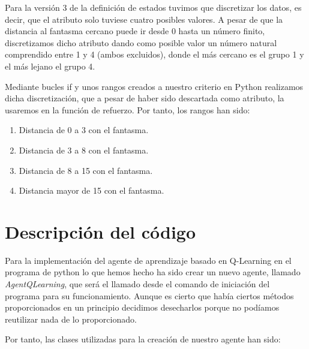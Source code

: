 \documentclass[11pt,a4paper]{article}
\begin{document}
Para la versión 3 de la definición de estados tuvimos que discretizar los datos, es decir, que el atributo solo tuviese cuatro posibles valores. A pesar de que la distancia al fantasma cercano puede ir desde 0 hasta un número finito, discretizamos dicho atributo dando como posible valor un número natural comprendido entre 1 y 4 (ambos excluidos), donde el más cercano es el grupo 1 y el más lejano el grupo 4.

Mediante bucles if y unos rangos creados a nuestro criterio en Python realizamos dicha discretización, que a pesar de haber sido descartada como atributo, la usaremos en la función de refuerzo. Por tanto, los rangos han sido:

\begin{enumerate}
\item Distancia de 0 a 3 con el fantasma.
\item Distancia de 3 a 8 con el fantasma.
\item Distancia de 8 a 15 con el fantasma.
\item Distancia mayor de 15 con el fantasma.
\end{enumerate}

\section{Descripción del código}

Para la implementación del agente de aprendizaje basado en Q-Learning en el programa de python lo que hemos hecho ha sido crear un nuevo agente, llamado \textit{AgentQLearning}, que será el llamado desde el comando de iniciación del programa para su funcionamiento. Aunque es cierto que había ciertos métodos proporcionados en un principio decidimos desecharlos porque no podíamos reutilizar nada de lo proporcionado.

Por tanto, las clases utilizadas para la creación de nuestro agente han sido:
\end{document}

